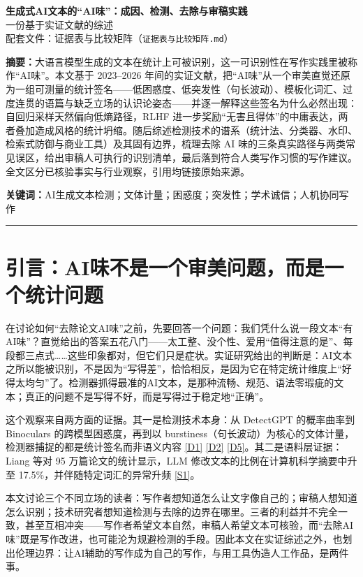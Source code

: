 \documentclass[10pt,a4paper]{ctexart}
\begin{document}
\begin{center}
{\LARGE\bfseries 生成式AI文本的“AI味”：成因、检测、去除与审稿实践}\\[8pt]
{\large 一份基于实证文献的综述}\\[6pt]
{\small 配套文件：证据表与比较矩阵（\texttt{证据表与比较矩阵.md}）}
\end{center}

\vspace{8pt}
\noindent\textbf{摘要：}大语言模型生成的文本在统计上可被识别，这一可识别性在写作实践里被称作“AI味”。本文基于 2023–2026 年间的实证文献，把“AI味”从一个审美直觉还原为一组可测量的统计签名——低困惑度、低突发性（句长波动）、模板化词汇、过度连贯的语篇与缺乏立场的认识论姿态——并逐一解释这些签名为什么必然出现：自回归采样天然偏向低熵路径，RLHF 进一步奖励“无害且得体”的中庸表达，两者叠加造成风格的统计坍缩。随后综述检测技术的谱系（统计法、分类器、水印、检索式防御与商业工具）及其固有边界，梳理去除 AI 味的三条真实路径与两类常见误区，给出审稿人可执行的识别清单，最后落到符合人类写作习惯的写作建议。全文区分已核验事实与行业观察，引用均链接原始来源。

\noindent\textbf{关键词：}AI生成文本检测；文体计量；困惑度；突发性；学术诚信；人机协同写作

\vspace{4pt}
\hrule

\section{引言：AI味不是一个审美问题，而是一个统计问题}

\begin{justifying}
在讨论如何“去除论文AI味”之前，先要回答一个问题：我们凭什么说一段文本“有AI味”？直觉给出的答案五花八门——太工整、没个性、爱用“值得注意的是”、每段都三点式……这些印象都对，但它们只是症状。实证研究给出的判断是：AI文本之所以能被识别，不是因为“写得差”，恰恰相反，是因为它在特定统计维度上“好得太均匀”了。检测器抓得最准的AI文本，是那种流畅、规范、语法零瑕疵的文本；真正的问题不是写得不好，而是写得过于稳定地“正确”。

这个观察来自两方面的证据。其一是检测技术本身：从 DetectGPT 的概率曲率到 Binoculars 的跨模型困惑度，再到以 burstiness（句长波动）为核心的文体计量，检测器捕捉的都是统计签名而非语义内容 \href{https://arxiv.org/abs/2301.11305}{[D1]} \href{https://arxiv.org/abs/2401.12070}{[D2]} \href{https://arxiv.org/abs/2511.21744}{[D5]}。其二是语料层证据：Liang 等对 95 万篇论文的统计显示，LLM 修改文本的比例在计算机科学摘要中升至 17.5\%，并伴随特定词汇的异常升频 \href{https://arxiv.org/abs/2404.01268}{[S1]}。

本文讨论三个不同立场的读者：写作者想知道怎么让文字像自己的；审稿人想知道怎么识别；技术研究者想知道检测与去除的边界在哪里。三者的利益并不完全一致，甚至互相冲突——写作者希望文本自然，审稿人希望文本可核验，而“去除AI味”既是写作改进，也可能沦为规避检测的手段。因此本文在实证综述之外，也划出伦理边界：让AI辅助的写作成为自己的写作，与用工具伪造人工作品，是两件事。

\end{justifying}
\end{document}
